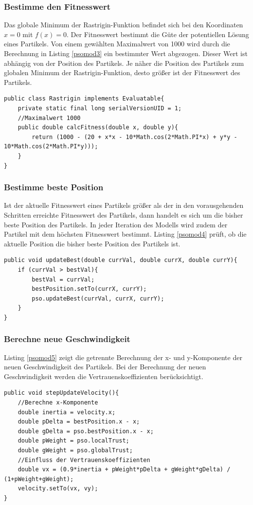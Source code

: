 \documentclass[a4paper, 11pt]{article}
\begin{document}
\subsubsection{Bestimme den Fitnesswert}
Das globale Minimum der Rastrigin-Funktion befindet sich bei den Koordinaten $x=0$ mit $f(x)=0$. Der Fitnesswert bestimmt die Güte der potentiellen Lösung eines Partikels. Von einem gewählten Maximalwert von 1000 wird durch die Berechnung in Listing \ref{psomod3} ein bestimmter Wert abgezogen. Dieser Wert ist abhängig von der Position des Partikels. Je näher die Position des Partikels zum globalen Minimum der Rastrigin-Funktion, desto größer ist der Fitnesswert des Partikels. \newline
\begin{lstlisting}[caption= PSO: Bestimme Fitnesswert,label = psomod3]
public class Rastrigin implements Evaluatable{
	private static final long serialVersionUID = 1;
	//Maximalwert 1000 
	public double calcFitness(double x, double y){
		return (1000 - (20 + x*x - 10*Math.cos(2*Math.PI*x) + y*y - 10*Math.cos(2*Math.PI*y)));
	}
}
\end{lstlisting}
\subsubsection{Bestimme beste Position}
Ist der aktuelle Fitnesswert eines Partikels größer als der in den vorausgehenden Schritten erreichte Fitnesswert des Partikels, dann handelt es sich um die bisher beste Position des Partikels. In jeder Iteration des Modells wird zudem der Partikel mit dem höchsten Fitnesswert bestimmt. Listing \ref{psomod4} prüft, ob die aktuelle Position die bisher beste Position des Partikels ist.\newline
\begin{lstlisting}[caption= PSO: Bestimme beste Position,label = psomod4]
public void updateBest(double currVal, double currX, double currY){
	if (currVal > bestVal){
		bestVal = currVal;
		bestPosition.setTo(currX, currY);
		pso.updateBest(currVal, currX, currY);
	}
}
\end{lstlisting}
\subsubsection{Berechne neue Geschwindigkeit}
Listing \ref{psomod5} zeigt die getrennte Berechnung der x- und y-Komponente der neuen Geschwindigkeit des Partikels. Bei der Berechnung der neuen Geschwindigkeit werden die Vertrauenskoeffizienten berücksichtigt.\newline
\begin{lstlisting}[caption= PSO: Berechne neue Geschwindigkeit,label = psomod5]
public void stepUpdateVelocity(){
	//Berechne x-Komponente
	double inertia = velocity.x;
	double pDelta = bestPosition.x - x;
	double gDelta = pso.bestPosition.x - x;
	double pWeight = pso.localTrust;
	double gWeight = pso.globalTrust;
	//Einfluss der Vertrauenskoeffizienten
	double vx = (0.9*inertia + pWeight*pDelta + gWeight*gDelta) / (1+pWeight+gWeight);
	velocity.setTo(vx, vy);         
}
\end{lstlisting}
\end{document}
